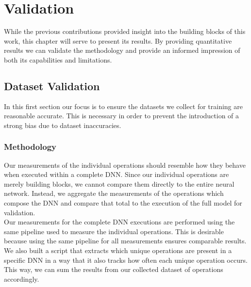 \chapter{Validation}\label{chap:contrib3}

While the previous contributions provided insight into the building blocks of this work, this chapter will serve to present its results. By providing quantitative results we can validate the methodology and provide an informed impression of both its capabilities and limitations. 


\section{Dataset Validation}
In this first section our focus is to ensure the datasets we collect for training are reasonable accurate. This is necessary in order to prevent the introduction of a strong bias due to dataset inaccuracies.

\subsection{Methodology}
Our measurements of the individual operations should resemble how they behave when executed within a complete DNN. Since our individual operations are merely 
building blocks, we cannot compare them directly to the entire neural network. Instead, we aggregate the measurements of the operations which compose the DNN and compare that total to the execution of the full model for validation. \\
Our measurements for the complete DNN executions are performed using the same pipeline used to measure the individual operations. This is desirable because using the same pipeline for all measurements ensures comparable results. \\
We also built a script that extracts which unique operations are present in a specific DNN in a way that it also tracks how often each unique operation occurs. This way, we can sum the results from our collected dataset of operations accordingly.


